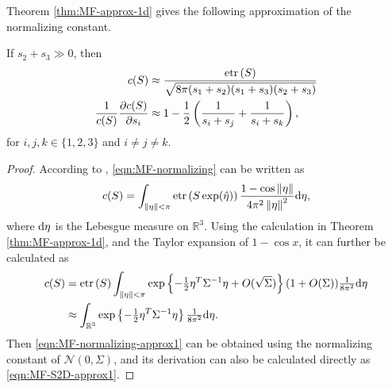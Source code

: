 Theorem \ref{thm:MF-approx-1d} gives the following approximation of the normalizing constant.
\begin{corollary} \label{cor:MF-normal-approx1}
	If $s_2+s_3\gg 0$, then
	\begin{align}
		c(S) &\approx \frac{\mathrm{etr}\left( S \right)}{\sqrt{8\pi(s_1+s_2)(s_1+s_3)(s_2+s_3)}} \label{eqn:MF-normalizing-approx1} \\
		\frac{1}{c(S)} \frac{\partial c(S)}{\partial s_i} &\approx 1 - \frac{1}{2}\left( \frac{1}{s_i+s_j} + \frac{1}{s_i+s_k} \right), \label{eqn:MF-S2D-approx1}
	\end{align}
	for $i,j,k\in\{1,2,3\}$ and $i\neq j\neq k$.
\end{corollary}
\begin{proof}
	According to \cite[Chapter 12.1.2]{chirikjian2011stochastic}, \eqref{eqn:MF-normalizing} can be written as
	\begin{align*}
		c(S) = \int_{\left\| \eta \right\|<\pi} \mathrm{etr}\left( S\exp(\hat{\eta}) \right) \frac{1-\cos\left\| \eta \right\|}{4\pi^2\left\| \eta \right\|^2} \mathrm{d}\eta,
	\end{align*}
	where $\mathrm{d}\eta$ is the Lebesgue measure on $\mathbb{R}^3$.
	Using the calculation in Theorem \ref{thm:MF-approx-1d}, and the Taylor expansion of $1-\cos x$, it can further be calculated as
	\begin{align*}
		c(S) &= \mathrm{etr}\left( S \right) \int_{\left\| \eta \right\|<\pi} \exp\left\{ -\tfrac{1}{2} \eta^T \Sigma^{-1} \eta + O(\sqrt{\Sigma}) \right\} (1+O(\Sigma)) \tfrac{1}{8\pi^2} \mathrm{d}\eta \\
		&\approx \int_{\mathbb{R}^3} \exp\left\{ -\tfrac{1}{2} \eta^T \Sigma^{-1} \eta \right\}  \tfrac{1}{8\pi^2} \mathrm{d}\eta.
	\end{align*}
	Then \eqref{eqn:MF-normalizing-approx1} can be obtained using the normalizing constant of $\mathcal{N}(0,\Sigma)$, and its derivation can also be calculated directly as \eqref{eqn:MF-S2D-approx1}.
\end{proof}


